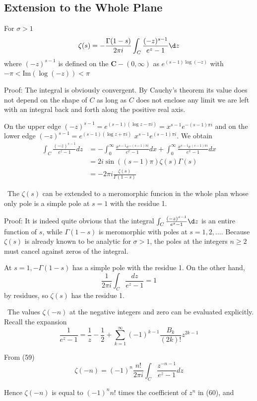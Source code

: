 \documentclass[12pt, oneside]{book}
\begin{document}
\subsection{Extension to the Whole Plane}
\begin{theorem}
    For $\sigma >1$
    $$\zeta (s) = -\frac{\Gamma (1-s)}{2 \pi i} \int_C \frac{(-z)^{s-1}}{e^z-1} \d z$$
    where $(-z)^{s-1}$ is defined on the $\mathbf{C} - (0,\infty)$ as $e^{(s-1) \log (-z)}$ with $-\pi < \mathrm{Im} \left(\log (-z)\right) <\pi$

    Proof:
    The integral is obviously convergent. By Cauchy's theorem its value does not depend on the shape of $C$ as long as $C$ does not enclose any limit we are left with an integral back and forth along the positive real axis.

    On the upper edge $(-z)^{s-1} = e^{(s-1)(\log z -\pi i) } = x^{s-1} e^{-(s-1) \pi i}$ and on the lower edge $(-z)^{s-1} = e^{(s-1)(\log z + \pi i) } $ $x^{s-1} e^{(s-1) \pi i}$. We obtain
    $$ \begin{aligned}
            \int_C \frac{(-z)^{s-1}}{e^z-1} d z &
            =-\int_0^{\infty} \frac{x^{s-1} e^{-(s-1) \pi i}}{e^x-1} d x+\int_0^{\infty} \frac{x^{s-1} e^{(s-1) \pi i}}{e^x-1} d x \\
                                                & =2  i \sin ((s-1) \pi)  \zeta(s) \Gamma(s)                                       \\
                                                & = -2 \pi i \frac{ \zeta(s)}{\Gamma(1-s)}
        \end{aligned}$$
\end{theorem}
\begin{theorem}\
    The $\zeta(s)$ can be extended to a meromorphic funcion in the whole plan whose only pole is a simple pole at $s=1$ with the residue 1.

    Proof:
    It is indeed quite obvious that the integral $\int_C \frac{(-z)^{s-1}}{e^z-1} \d z $
    is an entire function of $s$, while $\Gamma(1-s)$ is meromorphic with poles at $s=1,2, \ldots$. Because $\zeta(s)$ is already known to be analytic for $\sigma>1$, the poles at the integers $n \geq 2$ must cancel against zeros of the integral.

    At $s=1,-\Gamma(1-s)$ has a simple pole with the residue 1. On the other hand,
    $$
        \frac{1}{2 \pi i} \int_C \frac{d z}{e^z-1}=1
    $$
    by residues, so $\zeta(s)$ has the residue 1.
\end{theorem}
\begin{theorem}\
    The values $\zeta(-n)$ at the negative integers and zero can be evaluated explicitly. Recall the expansion
    $$
        \frac{1}{e^z-1} = \frac{1}{z} - \frac{1}{2}+ \sum_{k=1}^{\infty}(-1)^{k-1} \frac{B_k}{(2 k)!} z^{2 k-1}
    $$

    From (59)
    $$
        \zeta(-n)=(-1)^n \frac{n!}{2 \pi i} \int_C \frac{z^{-n-1}}{e^z-1} d z
    $$

    Hence $\zeta(-n)$ is equal to $(-1)^n n!$ times the coefficient of $z^n$ in (60), and
\end{theorem}
\end{document}
